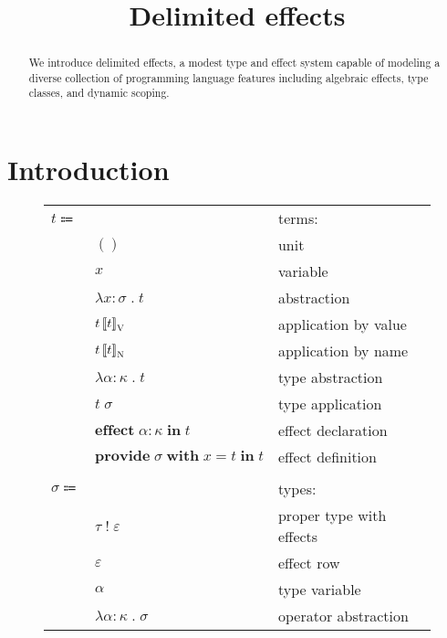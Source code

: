 \documentclass[12pt]{article}
\title{Delimited effects}
\date{}
\newcommand\anno[2]{#1 : #2} %
\newcommand\term{t}
\newcommand\eunit{()}
\newcommand\evar{x}
\newcommand\eabs[2]{\lambda #1 \; . \; #2} %
\newcommand\eappbv[2]{#1 \left\llbracket #2 \right\rrbracket_{\textsc{V}}} %
\newcommand\eappbn[2]{#1 \left\llbracket #2 \right\rrbracket_{\textsc{N}}} %
\newcommand\etabs[2]{\lambda #1 \; . \; #2} %
\newcommand\etapp[2]{#1 \; #2}
\newcommand\eeffect[3]{\textbf{effect} \; \anno{#1}{#2} \; \textbf{in} \; #3}
\newcommand\eprovide[4]{\textbf{provide} \; #1 \; \textbf{with} \; #2 = #3 \; \textbf{in} \; #4}
\newcommand\type{\sigma}
\newcommand\tptwithr[2]{#1 \; ! \; #2} %
\newcommand\tvar{\alpha}
\newcommand\tabs[2]{\lambda #1 \; . \; #2} %
\newcommand\properType{\tau}
\newcommand\row{\varepsilon}
\newcommand\kind{\kappa}
\begin{document}
  \maketitle

  \begin{abstract}
    We introduce delimited effects, a modest type and effect system capable of modeling a diverse collection of programming language features including algebraic effects, type classes, and dynamic scoping.
  \end{abstract}

  \section{Introduction}

  \begin{figure}
    \begin{mdframed}[backgroundcolor=none]
      \begin{center}
        \begin{tabular}{l l l}
          $\term \Coloneqq $ & & terms: \\
          & \color{blue} $\eunit$ & \color{blue} unit \\
          & $\evar$ & variable \\
          & $\eabs{\anno{\evar}{\type}}{\term}$ & abstraction \\
          & $\eappbv{\term}{\term}$ & application by value \\
          & $\eappbn{\term}{\term}$ & application by name \\
          & \color{red} $\etabs{\anno{\tvar}{\kind}}{\term}$ & \color{red} type abstraction \\
          & \color{red} $\etapp{\term}{\type}$ & \color{red} type application \\
          & $\eeffect{\tvar}{\kind}{\term}$ & effect declaration \\
          & $\eprovide{\type}{\evar}{\term}{\term}$ & effect definition \\
          \\
          $\type \Coloneqq$ & & types: \\
          & $\tptwithr{\properType}{\row}$ & proper type with effects \\
          & $\row$ & effect row \\
          & $\tvar$ & type variable \\
          & \color{red} $\tabs{\anno{\tvar}{\kind}}{\type}$ & \color{red} operator abstraction \\

\end{tabular}
\end{center}
\end{mdframed}
\end{figure}
\end{document}
